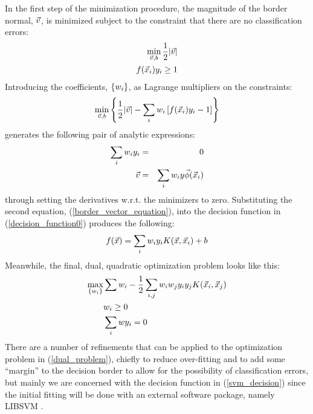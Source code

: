 \documentclass[11pt]{article}
\begin{document}
In the first step of the minimization procedure, 
the magnitude of the border normal, $\vec v$, 
is minimized subject to the constraint that there are no classification 
errors:
\begin{eqnarray}
	\min_{\vec v, b} \frac{1}{2} | \vec v | \\ \nonumber
	f(\vec {x}_i) y_i \ge 1
\end{eqnarray}
Introducing the coefficients, $\lbrace w_i \rbrace$, 
as Lagrange multipliers on the constraints:
\begin{equation}
	\min_{\vec v, b} \left \lbrace \frac{1}{2} | \vec v | - \sum_i w_i \left [ f(\vec {x}_i) y_i -1 \right ] \right \rbrace
\end{equation}
generates the following pair of analytic expressions:
\begin{eqnarray}
	\sum_i w_i y_i & = & 0 \\
	\vec v & = & \sum_i w_i y \vec\phi(\vec {x}_i) \label{border_vector_equation}
\end{eqnarray}
through setting the derivatives w.r.t. the minimizers to zero.
Substituting the second equation, (\ref{border_vector_equation}),
into the decision function in (\ref{decision_function0}) produces the following:
\begin{equation}
	f(\vec {x}) = \sum_i w_i y_i K (\vec {x}, \vec {x}_i) + b
	\label{svm_decision}
\end{equation}
Meanwhile, the final, dual, quadratic optimization problem looks like this:
\begin{eqnarray}
	\max_{\lbrace w_i \rbrace} & \sum w_i 
	- \frac{1}{2} \sum_{i, j} w_i w_j y_i y_j K(\vec {x}_i, \vec {x}_j) \\ \nonumber
	& w_i \ge 0 \\ \nonumber
	& \sum_i w y_i = 0 \label{dual_problem}
\end{eqnarray}
There are a number of refinements that can be applied to the optimization
problem in (\ref{dual_problem}), chiefly to reduce over-fitting and to add
some ``margin'' to the decision border to allow for the possibility of
classification errors, but mainly we are concerned with the decision
function in (\ref{svm_decision}) since the initial fitting will be done with
an external software package, namely LIBSVM \citep{Chang_Lin2011}.
\end{document}
